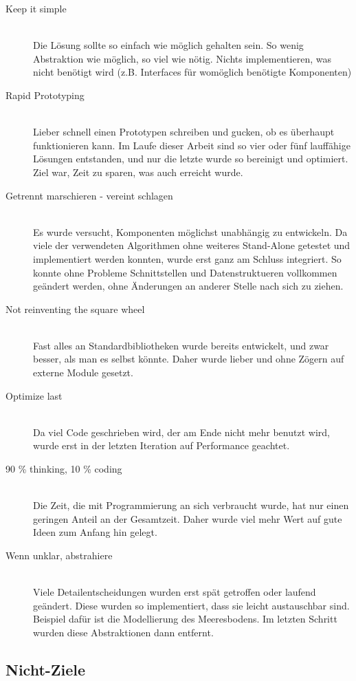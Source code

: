 \documentclass{article}
\begin{document}
\begin{description}
\item[Keep it simple] \hfill \\ Die Lösung sollte so einfach wie möglich gehalten sein. So wenig Abstraktion wie möglich, so viel wie nötig. Nichts implementieren, was nicht benötigt wird (z.B. Interfaces für womöglich benötigte Komponenten)
\item[Rapid Prototyping] \hfill \\ Lieber schnell einen Prototypen schreiben und gucken, ob es überhaupt funktionieren kann. Im Laufe
dieser Arbeit sind so vier oder fünf lauffähige Lösungen entstanden, und nur die letzte wurde so bereinigt und optimiert. Ziel
war, Zeit zu sparen, was auch erreicht wurde.
\item[Getrennt marschieren - vereint schlagen] \hfill \\ Es wurde versucht, Komponenten möglichst unabhängig zu entwickeln. Da viele 
der verwendeten Algorithmen ohne weiteres Stand-Alone getestet und implementiert werden konnten, wurde erst ganz am Schluss
integriert. So konnte ohne Probleme Schnittstellen und Datenstruktueren vollkommen geändert werden, ohne Änderungen an anderer
Stelle nach sich zu ziehen.
\item[Not reinventing the square wheel] \hfill \\ Fast alles an Standardbibliotheken wurde bereits entwickelt, und zwar besser, als man es
selbst könnte. Daher wurde lieber und ohne Zögern auf externe Module gesetzt.
\item[Optimize last] \hfill \\ Da viel Code geschrieben wird, der am Ende nicht mehr benutzt wird, wurde erst in der letzten Iteration
auf Performance geachtet. 
\item[90 \% thinking, 10 \% coding] \hfill \\ Die Zeit, die mit Programmierung an sich verbraucht wurde, hat nur einen geringen Anteil an
der Gesamtzeit. Daher wurde viel mehr Wert auf gute Ideen zum Anfang hin gelegt.
\item[Wenn unklar, abstrahiere] \hfill \\ Viele Detailentscheidungen wurden erst spät getroffen oder laufend geändert. Diese wurden so
implementiert, dass sie leicht austauschbar sind. Beispiel dafür ist die Modellierung des Meeresbodens. Im letzten Schritt
wurden diese Abstraktionen dann entfernt.
\end{description}

\subsection{Nicht-Ziele}
\end{document}
